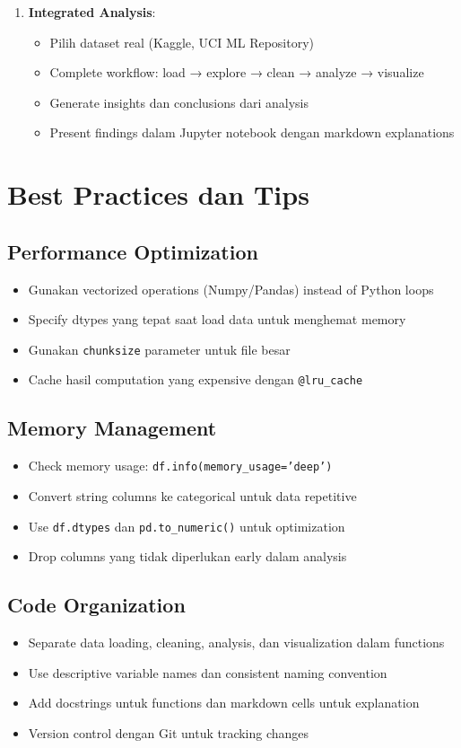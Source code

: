\begin{enumerate}
  \item \textbf{Integrated Analysis}:
  \begin{itemize}
    \item Pilih dataset real (Kaggle, UCI ML Repository)
    \item Complete workflow: load → explore → clean → analyze → visualize
    \item Generate insights dan conclusions dari analysis
    \item Present findings dalam Jupyter notebook dengan markdown explanations
  \end{itemize}
\end{enumerate}

\section*{Best Practices dan Tips}

\subsection*{Performance Optimization}
\begin{itemize}
  \item Gunakan vectorized operations (Numpy/Pandas) instead of Python loops
  \item Specify dtypes yang tepat saat load data untuk menghemat memory
  \item Gunakan \texttt{chunksize} parameter untuk file besar
  \item Cache hasil computation yang expensive dengan \texttt{@lru\_cache}
\end{itemize}

\subsection*{Memory Management}
\begin{itemize}
  \item Check memory usage: \texttt{df.info(memory\_usage='deep')}
  \item Convert string columns ke categorical untuk data repetitive
  \item Use \texttt{df.dtypes} dan \texttt{pd.to\_numeric()} untuk optimization
  \item Drop columns yang tidak diperlukan early dalam analysis
\end{itemize}

\subsection*{Code Organization}
\begin{itemize}
  \item Separate data loading, cleaning, analysis, dan visualization dalam functions
  \item Use descriptive variable names dan consistent naming convention
  \item Add docstrings untuk functions dan markdown cells untuk explanation
  \item Version control dengan Git untuk tracking changes
\end{itemize}

